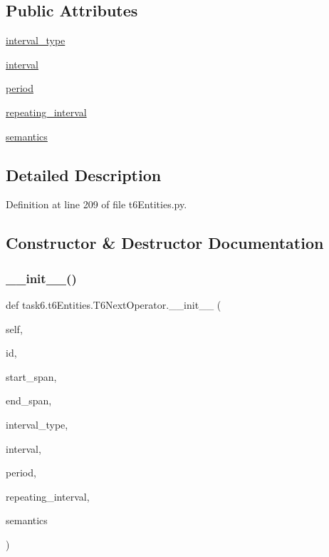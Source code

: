 \subsection*{Public Attributes}
\begin{DoxyCompactItemize}
\item 
\hyperlink{classtask6_1_1t6Entities_1_1T6NextOperator_a28e1b4345fea8b5436687c45d6daf2a9}{interval\+\_\+type}
\item 
\hyperlink{classtask6_1_1t6Entities_1_1T6NextOperator_a4059079dc037d178dbda878e60051ba0}{interval}
\item 
\hyperlink{classtask6_1_1t6Entities_1_1T6NextOperator_acc493ea5fb1baf65832d630812ae7299}{period}
\item 
\hyperlink{classtask6_1_1t6Entities_1_1T6NextOperator_a66a96468dd1b550691e461d897c05c99}{repeating\+\_\+interval}
\item 
\hyperlink{classtask6_1_1t6Entities_1_1T6NextOperator_a2d4bc12cdc90894fb48afc39adb4ffab}{semantics}
\end{DoxyCompactItemize}


\subsection{Detailed Description}


Definition at line 209 of file t6\+Entities.\+py.



\subsection{Constructor \& Destructor Documentation}
\mbox{\label{classtask6_1_1t6Entities_1_1T6NextOperator_a52ca482e1fb78073e0bfaa804558846d}} 
\subsubsection{\texorpdfstring{\+\_\+\+\_\+init\+\_\+\+\_\+()}{\_\_init\_\_()}}
{\footnotesize\ttfamily def task6.\+t6\+Entities.\+T6\+Next\+Operator.\+\_\+\+\_\+init\+\_\+\+\_\+ (\begin{DoxyParamCaption}\item[{}]{self,  }\item[{}]{id,  }\item[{}]{start\+\_\+span,  }\item[{}]{end\+\_\+span,  }\item[{}]{interval\+\_\+type,  }\item[{}]{interval,  }\item[{}]{period,  }\item[{}]{repeating\+\_\+interval,  }\item[{}]{semantics }\end{DoxyParamCaption})}



